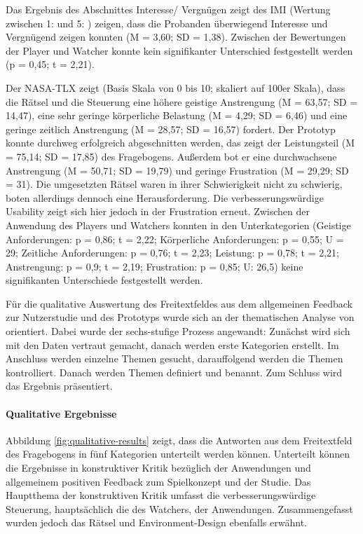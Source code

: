 Das Ergebnis des Abschnittes Interesse/ Vergnügen zeigt des \ac{IMI} (Wertung zwischen 1:  und 5: ) zeigen, dass die Probanden überwiegend Interesse und Vergnügend zeigen konnten (M = 3,60; SD = 1,38). Zwischen der Bewertungen der Player und Watcher konnte kein signifikanter Unterschied festgestellt werden (p = 0,45; t = 2,21). 

Der \ac{NASA-TLX} zeigt (Basis Skala von 0 bis 10; skaliert auf 100er Skala), dass die Rätsel und die Steuerung eine höhere geistige Anstrengung (M = 63,57; SD = 14,47), eine sehr geringe körperliche Belastung (M = 4,29; SD = 6,46) und eine geringe zeitlich Anstrengung (M = 28,57; SD = 16,57) fordert. 
Der Prototyp konnte durchweg erfolgreich abgeschnitten werden, das zeigt der Leistungsteil (M = 75,14; SD = 17,85) des Fragebogens. Außerdem bot er eine durchwachsene Anstrengung (M = 50,71; SD = 19,79) und geringe Frustration (M = 29,29; SD = 31). Die umgesetzten Rätsel waren in ihrer Schwierigkeit nicht zu schwierig, boten allerdings dennoch eine Herausforderung. Die verbesserungswürdige Usability zeigt sich hier jedoch in der Frustration erneut. Zwischen der Anwendung des Players und Watchers konnten in den Unterkategorien (Geistige Anforderungen: p = 0,86; t = 2,22; Körperliche Anforderungen: p = 0,55; U = 29; Zeitliche Anforderungen: p = 0,76; t = 2,23; Leistung: p = 0,78; t = 2,21; Anstrengung: p = 0,9; t = 2,19; Frustration: p = 0,85; U: 26,5) keine signifikanten Unterschiede festgestellt werden.


Für die qualitative Auswertung des Freitextfeldes  aus dem allgemeinen Feedback zur Nutzerstudie und des Prototyps wurde sich an der thematischen Analyse von \cite{braun_using_2006} orientiert. Dabei wurde der sechs-stufige Prozess angewandt: Zunächst wird sich mit den Daten vertraut gemacht, danach werden erste Kategorien erstellt. Im Anschluss werden einzelne Themen gesucht, darauffolgend werden die Themen kontrolliert. Danach werden Themen definiert und benannt. Zum Schluss wird das Ergebnis präsentiert.

\paragraph{Qualitative Ergebnisse}
Abbildung \ref{fig:qualitative-results} zeigt, dass die Antworten aus dem Freitextfeld des Fragebogens in fünf Kategorien unterteilt werden können.
Unterteilt können die Ergebnisse in konstruktiver Kritik bezüglich der Anwendungen und allgemeinem positiven Feedback zum Spielkonzept und der Studie.
Das Hauptthema der konstruktiven Kritik umfasst die verbesserungswürdige Steuerung, hauptsächlich die des Watchers, der Anwendungen. Zusammengefasst wurden jedoch das Rätsel und Environment-Design ebenfalls erwähnt.

